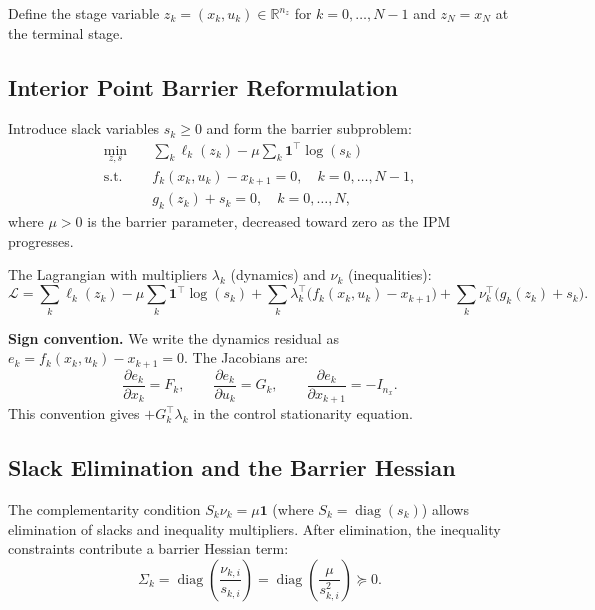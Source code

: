 \documentclass[11pt]{article}
\DeclareMathOperator{\diag}{diag}
\begin{document}
Define the stage variable $z_k = (x_k, u_k) \in \mathbb{R}^{n_z}$ for
$k = 0, \dots, N-1$ and $z_N = x_N$ at the terminal stage.


\subsection{Interior Point Barrier Reformulation}

Introduce slack variables $s_k \ge 0$ and form the barrier subproblem:
\begin{equation}\label{eq:barrier}
\begin{aligned}
  \min_{z, s} \quad & \sum_k \ell_k(z_k) - \mu \sum_k \mathbf{1}^\top \log(s_k) \\
  \text{s.t.} \quad
    & f_k(x_k, u_k) - x_{k+1} = 0, \quad k = 0, \dots, N-1, \\
    & g_k(z_k) + s_k = 0, \quad k = 0, \dots, N,
\end{aligned}
\end{equation}
where $\mu > 0$ is the barrier parameter, decreased toward zero as the IPM progresses.

The Lagrangian with multipliers $\lambda_k$ (dynamics) and $\nu_k$ (inequalities):
\begin{equation}\label{eq:lagrangian}
  \mathcal{L} = \sum_k \ell_k(z_k) - \mu \sum_k \mathbf{1}^\top \log(s_k)
  + \sum_k \lambda_k^\top \bigl(f_k(x_k, u_k) - x_{k+1}\bigr)
  + \sum_k \nu_k^\top \bigl(g_k(z_k) + s_k\bigr).
\end{equation}

\textbf{Sign convention.} We write the dynamics residual as
$e_k = f_k(x_k, u_k) - x_{k+1} = 0$. The Jacobians are:
\begin{equation}
  \frac{\partial e_k}{\partial x_k} = F_k, \qquad
  \frac{\partial e_k}{\partial u_k} = G_k, \qquad
  \frac{\partial e_k}{\partial x_{k+1}} = -I_{n_x}.
\end{equation}
This convention gives $+G_k^\top \lambda_k$ in the control stationarity equation.


\subsection{Slack Elimination and the Barrier Hessian}

The complementarity condition $S_k \nu_k = \mu \mathbf{1}$ (where $S_k = \diag(s_k)$)
allows elimination of slacks and inequality multipliers. After elimination, the
inequality constraints contribute a barrier Hessian term:
\begin{equation}
  \Sigma_k = \diag\!\left(\frac{\nu_{k,i}}{s_{k,i}}\right)
           = \diag\!\left(\frac{\mu}{s_{k,i}^2}\right) \succeq 0.
\end{equation}
\end{document}
